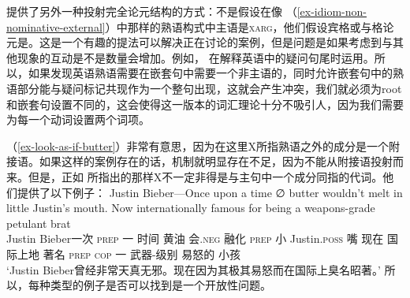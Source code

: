  \citet[\S~6]{KSF2015a}提供了另外一种投射完全论元结构的方式：不是假设在像 （\ref{ex-idiom-non-nominative-external}）中那样的熟语构式中主语是\textsc{xarg}，他们假设宾格或与格论元是\xargc。这是一个有趣的提法可以解决正在讨论的案例，但是问题是如果考虑到与其他现象的互动是不是数量会增加。例如， \citet{BF99a}在解释英语中的疑问句尾时运用\xargc。所以，如果发现英语熟语需要在嵌套句中需要一个非主语的\xargc，同时允许嵌套句中的熟语部分能与疑问标记共现作为一个整句出现，这就会产生冲突，我们就必须为root和嵌套句设置不同的\xargc，这会使得这一版本的词汇理论十分不吸引人，因为我们需要为每一个动词设置两个词项。

（\ref{ex-look-as-if-butter}）非常有意思，因为在这里X所指熟语之外的成分是一个附接语。如果这样的案例存在的话，\xargc 机制就明显存在不足，因为\xargc 不能从附接语投射而来。但是，正如 \citet{KSF2015a}所指出的那样X不一定非得是与主句中一个成分同指的代词。他们提供了以下例子：
\ea
\gll Justin Bieber—Once upon a time ∅ butter wouldn't melt in little Justin's mouth. Now internationally famous for being a weapons-grade petulant brat\\    %
     Justin Bieber一次 \textsc{prep} 一 时间 {} 黄油 会.\textsc{neg} 融化 \textsc{prep} 小 Justin.\textsc{poss} 嘴 现在 国际上地 著名 \textsc{prep} \textsc{cop} 一 武器-级别 易怒的 小孩\\
\glt `Justin Bieber曾经非常天真无邪。现在因为其极其易怒而在国际上臭名昭著。'
\z
所以，每种类型的例子是否可以找到是一个开放性问题。

